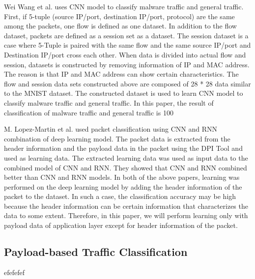 Wei Wang et al. uses CNN model to classify malware traffic and general traffic.
First, if 5-tuple (source IP/port, destination IP/port, protocol) are the same among the packets, one flow is defined as one dataset.
In addition to the flow dataset, packets are defined as a session set as a dataset.
The session dataset is a case where 5-Tuple is paired with the same flow and the same source IP/port and Destination IP/port cross each other.
When data is divided into actual flow and session, datasets is constructed by removing information of IP and MAC address.
The reason is that IP and MAC address can show certain characteristics.
The flow and session data sets constructed above are composed of 28 * 28 data similar to the MNIST dataset.
The constructed dataset is used to learn CNN model to classify malware traffic and general traffic.
In this paper, the result of classification of malware traffic and general traffic is 100%

M. Lopez-Martin et al. used packet classification using CNN and RNN combination of deep learning model. The packet data is extracted from the header information and the payload data in the packet using the DPI Tool and used as learning data. The extracted learning data was used as input data to the combined model of CNN and RNN. They showed that CNN and RNN combined better than CNN and RNN models.
In both of the above papers, learning was performed on the deep learning model by adding the header information of the packet to the dataset. In such a case, the classification accuracy may be high because the header information can be certain information that characterizes the data to some extent. Therefore, in this paper, we will perform learning only with payload data of application layer except for header information of the packet.

\subsection{Payload-based Traffic Classification}\label{subsec:payloadbased}
efefefef